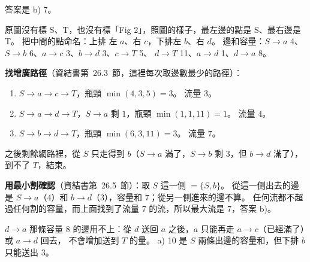 \begin{pastsoln}
答案是 b) 7。

原圖沒有標 S、T，也沒有標「Fig 2」，照圖的樣子，最左邊的點是 S、最右邊是 T。 把中間的點命名：上排
左 $a$、右 $c$，下排左 $b$、右 $d$。 邊和容量：$S \to a$ 4、$S \to b$ 6、$a \to c$ 3、$b \to d$ 3、$c \to T$ 5、
$d \to T$ 11、$a \to d$ 1、$d \to a$ 8。

\textbf{找增廣路徑}（資結書第~26.3~節，這裡每次取邊數最少的路徑）：
\begin{enumerate}
\item $S \to a \to c \to T$，瓶頸 $\min(4, 3, 5) = 3$。 流量 $3$。
\item $S \to a \to d \to T$，$S \to a$ 剩 $1$，瓶頸 $\min(1, 1, 11) = 1$。 流量 $4$。
\item $S \to b \to d \to T$，瓶頸 $\min(6, 3, 11) = 3$。 流量 $7$。
\end{enumerate}
之後剩餘網路裡，從 $S$ 只走得到 $b$（$S \to a$ 滿了，$S \to b$ 剩 $3$，但 $b \to d$ 滿了），到不了 $T$，結束。

\textbf{用最小割確認}（資結書第~26.5~節）：取 $S$ 這一側 $= \{S, b\}$。 從這一側出去的邊是 $S \to a$（4）和
$b \to d$（3），容量和 $7$；從另一側進來的邊不算。 任何流都不超過任何割的容量，而上面找到了流量 $7$
的流，所以最大流是 $7$，答案 b)。

$d \to a$ 那條容量 $8$ 的邊用不上：從 $d$ 送回 $a$ 之後，$a$ 只能再走 $a \to c$（已經滿了）或 $a \to d$ 回去，
不會增加送到 $T$ 的量。 a) 10 是 $S$ 兩條出邊的容量和，但下排 $b$ 只能送出 $3$。
\end{pastsoln}
